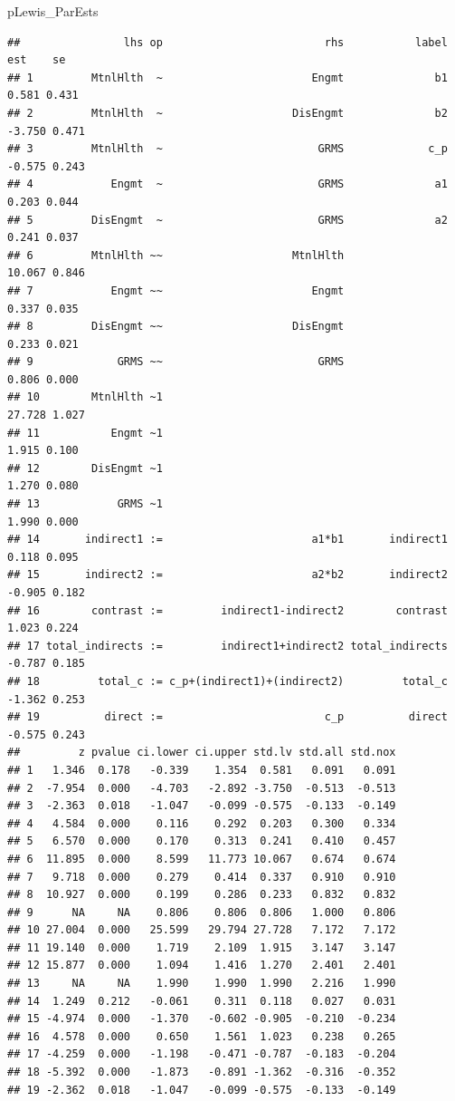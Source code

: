 \documentclass[
  11pt,
]{book}
\newenvironment{Shaded}{\begin{snugshade}}{\end{snugshade}}
\newcommand{\NormalTok}[1]{#1}
\begin{document}
\begin{Shaded}
\begin{Highlighting}[]
\NormalTok{pLewis\_ParEsts}
\end{Highlighting}
\end{Shaded}

\begin{verbatim}
##                lhs op                         rhs           label    est    se
## 1         MtnlHlth  ~                       Engmt              b1  0.581 0.431
## 2         MtnlHlth  ~                    DisEngmt              b2 -3.750 0.471
## 3         MtnlHlth  ~                        GRMS             c_p -0.575 0.243
## 4            Engmt  ~                        GRMS              a1  0.203 0.044
## 5         DisEngmt  ~                        GRMS              a2  0.241 0.037
## 6         MtnlHlth ~~                    MtnlHlth                 10.067 0.846
## 7            Engmt ~~                       Engmt                  0.337 0.035
## 8         DisEngmt ~~                    DisEngmt                  0.233 0.021
## 9             GRMS ~~                        GRMS                  0.806 0.000
## 10        MtnlHlth ~1                                             27.728 1.027
## 11           Engmt ~1                                              1.915 0.100
## 12        DisEngmt ~1                                              1.270 0.080
## 13            GRMS ~1                                              1.990 0.000
## 14       indirect1 :=                       a1*b1       indirect1  0.118 0.095
## 15       indirect2 :=                       a2*b2       indirect2 -0.905 0.182
## 16        contrast :=         indirect1-indirect2        contrast  1.023 0.224
## 17 total_indirects :=         indirect1+indirect2 total_indirects -0.787 0.185
## 18         total_c := c_p+(indirect1)+(indirect2)         total_c -1.362 0.253
## 19          direct :=                         c_p          direct -0.575 0.243
##         z pvalue ci.lower ci.upper std.lv std.all std.nox
## 1   1.346  0.178   -0.339    1.354  0.581   0.091   0.091
## 2  -7.954  0.000   -4.703   -2.892 -3.750  -0.513  -0.513
## 3  -2.363  0.018   -1.047   -0.099 -0.575  -0.133  -0.149
## 4   4.584  0.000    0.116    0.292  0.203   0.300   0.334
## 5   6.570  0.000    0.170    0.313  0.241   0.410   0.457
## 6  11.895  0.000    8.599   11.773 10.067   0.674   0.674
## 7   9.718  0.000    0.279    0.414  0.337   0.910   0.910
## 8  10.927  0.000    0.199    0.286  0.233   0.832   0.832
## 9      NA     NA    0.806    0.806  0.806   1.000   0.806
## 10 27.004  0.000   25.599   29.794 27.728   7.172   7.172
## 11 19.140  0.000    1.719    2.109  1.915   3.147   3.147
## 12 15.877  0.000    1.094    1.416  1.270   2.401   2.401
## 13     NA     NA    1.990    1.990  1.990   2.216   1.990
## 14  1.249  0.212   -0.061    0.311  0.118   0.027   0.031
## 15 -4.974  0.000   -1.370   -0.602 -0.905  -0.210  -0.234
## 16  4.578  0.000    0.650    1.561  1.023   0.238   0.265
## 17 -4.259  0.000   -1.198   -0.471 -0.787  -0.183  -0.204
## 18 -5.392  0.000   -1.873   -0.891 -1.362  -0.316  -0.352
## 19 -2.362  0.018   -1.047   -0.099 -0.575  -0.133  -0.149
\end{verbatim}
\end{document}
